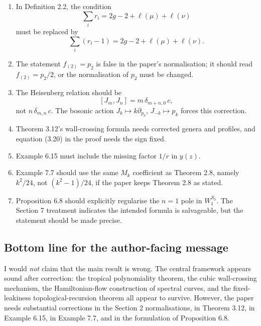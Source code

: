 \documentclass[11pt]{article}
\newcommand{\ellp}{\ell}
\begin{document}
\begin{enumerate}[label=(\alph*)]
   \item In Definition 2.2, the condition
   \[
      \sum_i r_i = 2g - 2 + \ellp(\mu) + \ellp(\nu)
   \]
   must be replaced by
   \[
      \sum_i (r_i - 1) = 2g - 2 + \ellp(\mu) + \ellp(\nu).
   \]

   \item The statement $f_{(2)} = p_2$ is false in the paper's normalisation; it should read $f_{(2)} = p_2/2$, or the normalisation of $p_2$ must be changed.

   \item The Heisenberg relation should be
   \[
      [J_m, J_n] = m\,\delta_{m+n,0}\,c,
   \]
   not $n\,\delta_{m,n}\,c$.  The bosonic action $J_k \mapsto k\partial_{p_k}$, $J_{-k} \mapsto p_k$ forces this correction.

   \item Theorem 3.12's wall-crossing formula needs corrected genera and profiles, and equation (3.20) in the proof needs the sign fixed.

   \item Example 6.15 must include the missing factor $1/r$ in $y(z)$.

   \item Example 7.7 should use the same $M_k$ coefficient as Theorem 2.8, namely $k^2/24$, not $(k^2-1)/24$, if the paper keeps Theorem 2.8 as stated.

   \item Proposition 6.8 should explicitly regularise the $n=1$ pole in $W^{S_0}_1$.  The Section 7 treatment indicates the intended formula is salvageable, but the statement should be made precise.
\end{enumerate}

\subsection*{Bottom line for the author-facing message}

I would \emph{not} claim that the main result is wrong.  The central framework appears sound after correction: the tropical polynomiality theorem, the cubic wall-crossing mechanism, the Hamiltonian-flow construction of spectral curves, and the fixed-leakiness topological-recursion theorem all appear to survive.  However, the paper needs substantial corrections in the Section 2 normalisations, in Theorem 3.12, in Example 6.15, in Example 7.7, and in the formulation of Proposition 6.8.
\end{document}
